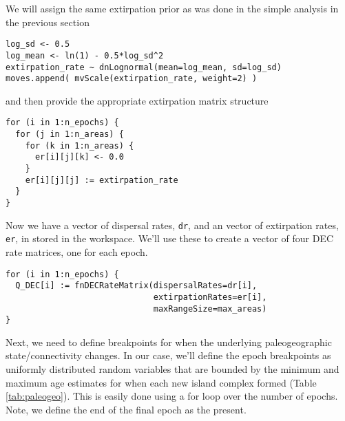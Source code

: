 

We will assign the same extirpation prior as was done in the simple analysis in the previous section

\begin{snugshade}
\begin{lstlisting}
log_sd <- 0.5
log_mean <- ln(1) - 0.5*log_sd^2
extirpation_rate ~ dnLognormal(mean=log_mean, sd=log_sd)
moves.append( mvScale(extirpation_rate, weight=2) )
\end{lstlisting}
\end{snugshade}

and then provide the appropriate extirpation matrix structure

\begin{snugshade}
\begin{lstlisting}
for (i in 1:n_epochs) {
  for (j in 1:n_areas) {
    for (k in 1:n_areas) {
      er[i][j][k] <- 0.0
    }
    er[i][j][j] := extirpation_rate
  }
}
\end{lstlisting}
\end{snugshade}

Now we have a vector of dispersal rates, {\tt dr}, and an vector of extirpation rates, {\tt er}, in stored in the \RevBayes workspace.
We'll use these to create a vector of four DEC rate matrices, one for each epoch.

\begin{snugshade}
\begin{lstlisting}
for (i in 1:n_epochs) {
  Q_DEC[i] := fnDECRateMatrix(dispersalRates=dr[i],
                              extirpationRates=er[i],
                              maxRangeSize=max_areas)
}
\end{lstlisting}
\end{snugshade}

Next, we need to define breakpoints for when the underlying paleogeographic state/connectivity changes.
In our case, we'll define the epoch breakpoints as uniformly distributed random variables that are bounded by the minimum and maximum age estimates for when each new island complex formed (Table \ref{tab:paleogeo}).
This is easily done using a for loop over the number of epochs.
Note, we define the end of the final epoch as the present.

